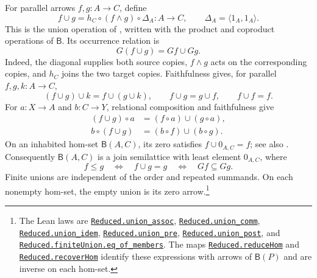 \documentclass[11pt]{article}
\newcommand{\B}{\mathsf B}
\begin{document}
For parallel arrows $f,g:A\to C$, define
\[
 f\cup g=h_C\circ(f\wedge g)\circ\Delta_A:A\longrightarrow C,
 \qquad \Delta_A=\langle1_A,1_A\rangle.
\]
This is the union operation of \cite[p.~220]{DP}, written with
the product and coproduct operations of $\B$. Its occurrence
relation is
\[
 G(f\cup g)=Gf\cup Gg.
\]
Indeed, the diagonal supplies both source copies, $f\wedge g$
acts on the corresponding copies, and $h_C$ joins the two target
copies. Faithfulness gives, for parallel $f,g,k:A\to C$,
\[
 (f\cup g)\cup k=f\cup(g\cup k),\qquad
 f\cup g=g\cup f,\qquad f\cup f=f.
\]
For $a:X\to A$ and $b:C\to Y$, relational composition and
faithfulness give
\[
 \begin{aligned}
 (f\cup g)\circ a&=(f\circ a)\cup(g\circ a),\\
 b\circ(f\cup g)&=(b\circ f)\cup(b\circ g).
 \end{aligned}
\]
On an inhabited hom-set $\B(A,C)$, its zero satisfies
$f\cup0_{A,C}=f$; see also \cite[pp.~290--291]{DP}.
Consequently $\B(A,C)$ is a join semilattice with least element
$0_{A,C}$, where
\[
 f\leq g\quad\Longleftrightarrow\quad f\cup g=g
 \quad\Longleftrightarrow\quad Gf\subseteq Gg.
\]
Finite unions are independent of the order and repeated
summands. On each nonempty hom-set, the empty union is its zero arrow.\footnote{\raggedright The Lean laws are
\href{https://github.com/flengyel/Dosen-Petric-Maximality/blob/5dbee39bea09539bd130f729e82636419f71f920/DosenPetric/ReducedUnion.lean\#L131}{\texttt{Reduced.\allowbreak{}union\_assoc}},
\href{https://github.com/flengyel/Dosen-Petric-Maximality/blob/5dbee39bea09539bd130f729e82636419f71f920/DosenPetric/ReducedUnion.lean\#L90}{\texttt{Reduced.\allowbreak{}union\_comm}},
\href{https://github.com/flengyel/Dosen-Petric-Maximality/blob/5dbee39bea09539bd130f729e82636419f71f920/DosenPetric/ReducedUnion.lean\#L97}{\texttt{Reduced.\allowbreak{}union\_idem}},
\href{https://github.com/flengyel/Dosen-Petric-Maximality/blob/5dbee39bea09539bd130f729e82636419f71f920/DosenPetric/ReducedUnion.lean\#L80}{\texttt{Reduced.\allowbreak{}union\_pre}},
\href{https://github.com/flengyel/Dosen-Petric-Maximality/blob/5dbee39bea09539bd130f729e82636419f71f920/DosenPetric/ReducedUnion.lean\#L85}{\texttt{Reduced.\allowbreak{}union\_post}}, and
\href{https://github.com/flengyel/Dosen-Petric-Maximality/blob/5dbee39bea09539bd130f729e82636419f71f920/DosenPetric/ReducedFiniteUnion.lean\#L57}{\texttt{Reduced.finiteUnion.\allowbreak{}eq\_of\_members}}.
The maps \href{https://github.com/flengyel/Dosen-Petric-Maximality/blob/5dbee39bea09539bd130f729e82636419f71f920/DosenPetric/ReducedQuotientReduction.lean\#L21}{\texttt{Reduced.\allowbreak{}reduceHom}} and
\href{https://github.com/flengyel/Dosen-Petric-Maximality/blob/5dbee39bea09539bd130f729e82636419f71f920/DosenPetric/ReducedRecovery.lean\#L26}{\texttt{Reduced.\allowbreak{}recoverHom}} identify these expressions
with arrows of $\B(P)$ and are inverse on each hom-set.}
\end{document}

